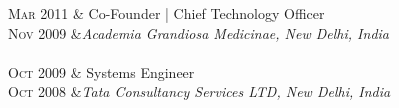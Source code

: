 \begin{longtable}
	\textsc{Mar 2011} & Co-Founder | Chief Technology Officer\\
	\textsc{Nov 2009} &\emph{Academia Grandiosa Medicinae, New Delhi, India}\\
	 \\

	\textsc{Oct 2009} & Systems Engineer\\
	\textsc{Oct 2008} &\emph{Tata Consultancy Services LTD, New Delhi, India}\\
	 \\

\end{longtable}

